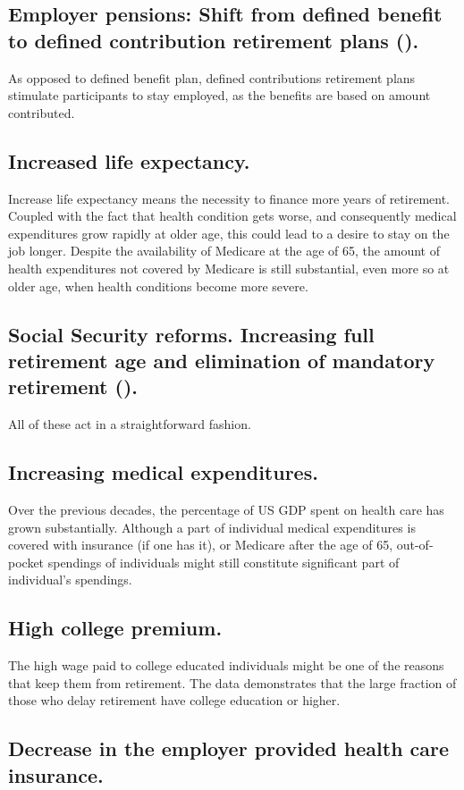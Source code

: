 \documentclass[
10pt, %
a4paper, %
oneside, %
headinclude,footinclude, %
BCOR5mm, %
]{scrartcl}
\begin{document}
\subsection{Employer pensions: Shift from defined benefit to defined contribution retirement plans (\cite{Clark2002}).} As opposed to defined benefit plan, defined contributions retirement plans stimulate participants to stay employed, as the benefits are based on amount contributed.
\subsection{Increased life expectancy.} Increase life expectancy means the necessity to finance more years of retirement. Coupled with the fact that health condition gets worse, and consequently medical expenditures grow rapidly at older age, this could lead to a desire to stay on the job longer. Despite the availability of Medicare at the age of 65, the amount of health expenditures not covered by Medicare is still substantial, even more so at older age, when health conditions become more severe.
\subsection{Social Security reforms. Increasing full retirement age and elimination of mandatory retirement (\cite{Clark2002}).} All of these act in a straightforward fashion. 
\subsection{Increasing medical expenditures.} Over the previous decades, the percentage of US GDP spent on health care has grown substantially. Although a part of individual medical expenditures is covered with insurance (if one has it), or Medicare after the age of 65, out-of-pocket spendings of individuals might still constitute  significant part of individual's spendings.
\subsection{High college premium.}
The high wage paid to college educated individuals might be one of the reasons that keep them from retirement. The data demonstrates that the large fraction of those who delay retirement have college education or higher.
\subsection{Decrease in the employer provided health care insurance.}
\end{document}
